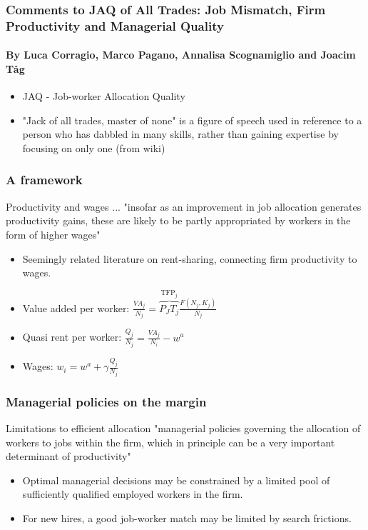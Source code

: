 \documentclass[usenames,dvipsnames,10pt]{beamer}
\begin{document}
\begin{frame} 
\frametitle{Comments to JAQ of All Trades: Job Mismatch,
Firm Productivity and Managerial Quality}
\framesubtitle{By Luca Corragio, Marco Pagano, Annalisa
Scognamiglio and Joacim Tåg}

\begin{itemize}
    \item JAQ -  Job-worker Allocation Quality
    \item "Jack of all trades, master of none" is a figure of speech used in reference to a person who has dabbled in many skills, rather than gaining expertise by focusing on only one (from wiki)
\end{itemize}
\end{frame}

\begin{frame} 
\frametitle{A framework} 
\begin{exampleblock}{Productivity and wages}
... "insofar as an improvement in job allocation generates productivity gains, these are likely to be partly appropriated by workers in the form of higher wages"
\end{exampleblock}
\begin{itemize}
    \item  Seemingly related literature on rent-sharing, connecting firm productivity to wages.
   \end{itemize}
\begin{itemize}
    \item Value added per worker: $\frac{VA_j}{N_j} = \overbrace{P_J T_j}^{\text{TFP}_j}\frac{F(N_j,K_j)}{N_j}$        
   \end{itemize}
\begin{itemize}
    \item Quasi rent per worker: $\frac{Q_j}{N_j} = \frac{VA_j}{N_i} - w^a$
   \end{itemize}
\begin{itemize}
    \item Wages: $w_i = w^a + \gamma\frac{Q_j}{N_j}$
\end{itemize}    
\end{frame}

\begin{frame} 
\frametitle{Managerial policies on the margin} 
\begin{exampleblock}{Limitations to efficient allocation}
 "managerial policies governing the allocation of workers to jobs within the firm, which in principle can be a very important determinant of productivity"
\end{exampleblock}
\begin{itemize}
    \item Optimal managerial decisions may be constrained by a limited pool of sufficiently qualified employed workers in the firm.
    \item For new hires, a good job-worker match may be limited by search frictions.
   \end{itemize}
\end{frame}
\end{document}
